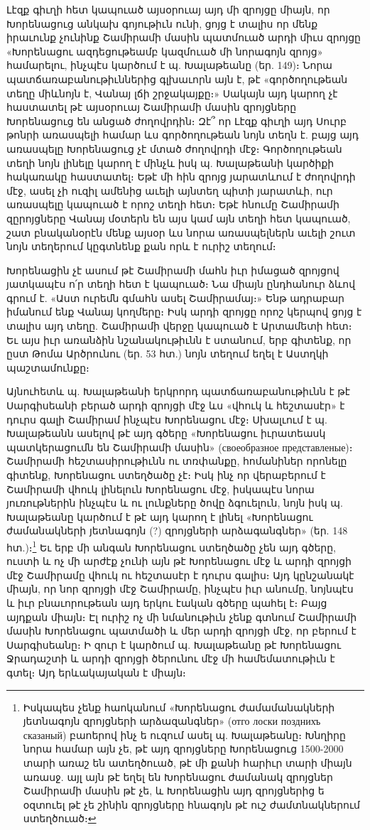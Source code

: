 \documentclass{article}
\begin{document}
{Լէզք գիւղի հետ կապուած այսօրուայ այդ մի զրոյցը միայն, որ Խորենացուց անկախ գոյութիւն ունի, ցոյց է տալիս որ մենք իրաւունք չունինք Շամիրամի մասին պատմուած արդի միւս զրոյցը «Խորենացու ազդեցութեամբ կազմուած մի նորագոյն զրոյց» համարելու, ինչպէս կարծում է պ. Խալաթեանը (եր. 149)։ Նորա պատճառաբանութիւններից գլխաւորն այն է, թէ «գործողութեան տեղը միևնոյն է, Վանայ լճի շրջակայքը։» Սակայն այդ կարող չէ հաստատել թէ այսօրուայ Շամիրամի մասին զրոյցները Խորենացուց են անցած ժողովրդին։ Զէ՞ որ Լէզք գիւղի այդ Սուրբ թոնրի առասպելի համար ևս գործողութեան նոյն տեղն է. բայց այդ առասպելը Խորենացուց չէ մտած ժողովրդի մէջ։ Գործողութեան տեղի նոյն լինելը կարող է մինչև իսկ պ. Խալաթեանի կարծիքի հակառակը հաստատել։ Եթէ մի հին զրոյց յարատևում է ժողովրդի մէջ, ասել չի ուզիլ ամենից աւելի այնտեղ պիտի յարատևի, ուր առասպելը կապուած է որոշ տեղի հետ։ Եթէ հնումը Շամիրամի զըրոյցները Վանայ մօտերն են այս կամ այն տեղի հետ կապուած, շատ բնականօրէն մենք այսօր ևս նորա առասպելներն աւելի շուտ նոյն տեղերում կըգտնենք քան որև է ուրիշ տեղում։

Խորենացին չէ ասում թէ Շամիրամի մահն իւր իմացած զրոյցով յատկապէս ո՛ր տեղի հետ է կապուած։ Նա միայն ընդհանուր ձևով գրում է. «Աստ ուրեմն գմահն ասել Շամիրամայ։» Ենթ ադրաբար իմանում ենք Վանայ կողմերը։ Իսկ արդի զրոյցը որոշ կերպով ցոյց է տալիս այդ տեղը. Շամիրամի վերջը կապուած է Արտամետի հետ։ Եւ այս իւր առանձին նշանակութիւնն է ստանում, երբ գիտենք, որ ըստ Թոմա Արծրունու (եր. 53 հտ.) նոյն տեղում եղել է Աստղկի պաշտամունքը։

Այնուհետև պ. Խալաթեանի երկրորդ պատճառաբանութիւնն է թէ Սարգիսեանի բերած արդի զրոյցի մէջ ևս «վհուկ և հեշտասէր» է դուրս գալի Շամիրամ ինչպէս Խորենացու մէջ։ Սխալւում է պ. Խալաթեանն ասելով թէ այդ գծերը «Խորենացու իւրատեասկ պատկերացումն են Շամիրամի մասին» (своеобразное представленые)։ Շամիրամի հեշտասիրութիւնն ու տռփանքը, հոմանիներ որոնելը գիտենք, Խորենացու ստեղծածը չէ։ Իսկ ինչ որ վերաբերում է Շամիրամի վհուկ լինելուն Խորենացու մէջ, իսկապէս նորա յուռութներին ինչպէս և ու լունքները ծովը ձգուելուն, նոյն իսկ պ. Խալաթեանը կարծում է թէ այդ կարող է լինել «Խորենացու ժամանակների յետնագոյն (?) զրոյցների արձագանգներ» (եր. 148 հտ.)։\footnote{Իսկապես չենք հաոկանում «Խորենացու ժամամանակների յետնագոյն զրոյցների արձազանգներ» (отго лоски позднихъ сказаный) բաոերով ինչ ե ուզում ասել պ. Խալաթեանը։ Խնղիրը նորա համար այն չե, թէ այդ զրոյցները Խորենացուց 1500-2000 տարի առաշ են ատեղծուած, թէ մի քանի հարիւր տարի միայն առասջ. այլ այն թէ եղել են Խորենացու ժամանակ զրոյցներ Շամիրամի մասին թէ չե, և Խորենացին այդ զրոյցներից ե օզտուել թէ չե շինին զրոյցները հնագոյն թէ ուշ ժամտնակներում ստեղծուած։} Եւ երբ մի անգան Խորենացու ստեղծածը չեն այդ գծերը, ուստի և ոչ մի արժէք չունի այն թէ Խորենացու մէջ և արդի զրոյցի մէջ Շամիրամը վհուկ ու հեշտասէր է դուրս գալիս։ Այդ կընշանակէ միայն, որ նոր զրոյցի մէջ Շամիրամը, ինչպէս իւր անումը, նոյնպէս և իւր բնաւորութեան այդ երկու էական գծերը պահել է։ Բայց այդքան միայն։ Էլ ուրիշ ոչ մի նմանութիւն չենք գտնում Շամիրամի մասին Խորենացու պատմածի և մեր արդի զրոյցի մէջ, որ բերում է Սարգիսեանը։ Ի զուր է կարծում պ. Խալաթեանը թէ Խորենացու Ջրադաշտի և արդի զրոյցի ծերունու մէջ մի համեմատութիւն է գտել։ Այդ երևակայական է միայն։

}
\end{document}
